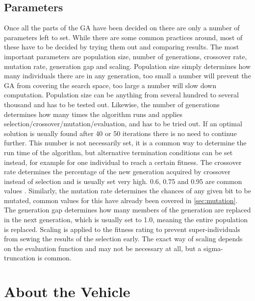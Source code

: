 \subsection{Parameters}
\label{sec:parameters}

Once all the parts of the GA have been decided on there are only a number of parameters left to set. While there are some common practices around, most of these have to be decided by trying them out and comparing results. The most important parameters are population size, number of generations, crossover rate, mutation rate, generation gap and scaling. Population size simply determines how many individuals there are in any generation, too small a number will prevent the GA from covering the search space, too large a number will slow down computation. Population size can be anything from several hundred to several thousand and has to be tested out. Likewise, the number of generations determines how many times the algorithm runs and applies selection/crossover/mutation/evaluation, and has to be tried out. If an optimal solution is usually found after 40 or 50 iterations there is no need to continue further. This number is not necessarily set, it is a common way to determine the run time of the algorithm, but alternative termination conditions can be set instead, for example for one individual to reach a certain fitness. The crossover rate determines the percentage of the new generation acquired by crossover instead of selection and is usually set very high. 0.6, 0.75 and 0.95 are common values \cite{20, 22,24}. Similarly, the mutation rate determines the chances of any given bit to be mutated, common values for this have already been covered in \ref{sec:mutation}. The generation gap determines how many members of the generation are replaced in the next generation, which is usually set to 1.0, meaning the entire population is replaced. Scaling is applied to the fitness rating to prevent super-individuals from sewing the results of the selection early. The exact way of scaling depends on the evaluation function and may not be necessary at all, but a sigma-truncation is common. \cite{26}

\section{About the Vehicle}
\label{sec:previous_knowledge_vehicle}

